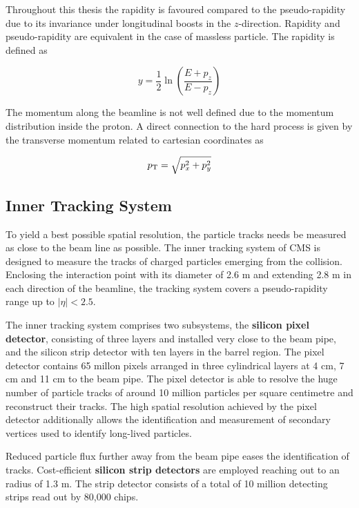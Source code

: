 Throughout this thesis the rapidity is favoured compared to the pseudo-rapidity
due to its invariance under longitudinal boosts in the $z$-direction. Rapidity
and pseudo-rapidity are equivalent in the case of massless particle. The
rapidity is defined as

\begin{equation}
    y = \frac{1}{2} \ln \left( \frac{E + p_z}{E - p_z} \right) 
\end{equation}

The momentum along the beamline is not well defined due to the momentum
distribution inside the proton. A direct connection to the hard process is given
by the transverse momentum \pt related to cartesian coordinates as

\begin{equation}
    p_{\mathrm{T}} = \sqrt{p_x^2 + p_y^2}
\end{equation}

\subsection{Inner Tracking System}

To yield a best possible spatial resolution, the particle tracks needs be
measured as close to the beam line as possible. The inner tracking system of CMS
is designed to measure the tracks of charged particles emerging from the
collision. Enclosing the interaction point with its diameter of 2.6 m and
extending 2.8 m in each direction of the beamline, the tracking system covers a
pseudo-rapidity range up to $|\eta| < 2.5$. 

The inner tracking system comprises two subsystems, the \textbf{silicon pixel
detector}, consisting of three layers and installed very close to the beam pipe,
and the silicon strip detector with ten layers in the barrel region. The pixel
detector contains 65 millon pixels arranged in three cylindrical layers at 4 cm,
7 cm and 11 cm to the beam pipe. The pixel detector is able to resolve the huge
number of particle tracks of around 10 million particles per square centimetre
and reconstruct their tracks. The high spatial resolution achieved by the pixel
detector additionally allows the identification and measurement of secondary
vertices used to identify long-lived particles.

Reduced particle flux further away from the beam pipe eases the identification
of tracks. Cost-efficient \textbf{silicon strip detectors} are employed reaching out to
an radius of 1.3 m. The strip detector consists of a total of 10 million
detecting strips read out by 80,000 chips. 

